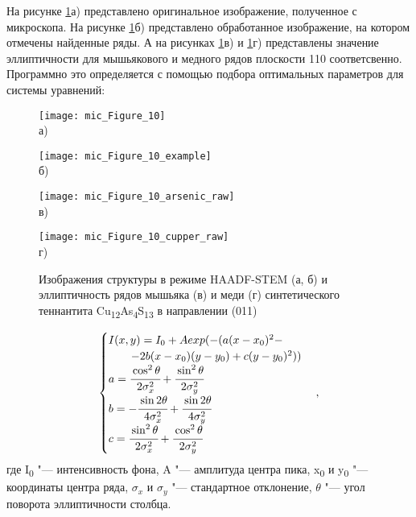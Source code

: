На рисунке \ref{img:mic1}а) представлено оригинальное изображение, полученное с микроскопа. На рисунке \ref{img:mic1}б) представлено обработанное изображение, на котором отмечены найденные ряды. А на рисунках \ref{img:mic1}в) и \ref{img:mic1}г) представлены значение эллиптичности для  мышьякового и медного рядов плоскости 110 соответсвенно.
Программно это определяется с помощью подбора оптимальных параметров для системы уравнений:
\begin{figure}[p!]
  \begin{minipage}[ht]{0.5\linewidth}\centering
    \texttt{[image: mic\_Figure\_10]} \\ а)
  \end{minipage}
  \hfill
  \begin{minipage}[ht]{0.5\linewidth}\centering
    \texttt{[image: mic\_Figure\_10\_example]} \\ б)
  \end{minipage}
\vfill
  \begin{minipage}[ht]{0.5\linewidth}\centering
    \texttt{[image: mic\_Figure\_10\_arsenic\_raw]} \\ в)
  \end{minipage}
  \hfill
  \begin{minipage}[ht]{0.5\linewidth}\centering
    \texttt{[image: mic\_Figure\_10\_cupper\_raw]} \\ г)
  \end{minipage}

      \caption[Изображения структуры в режиме HAADF-STEM (а, б) и эллиптичность рядов мышьяка (в) и меди (г) синтетического теннантита Cu\textsubscript{12}As\textsubscript{4}S\textsubscript{13} в направлении (011)]{Изображения структуры в режиме HAADF-STEM (а, б) и эллиптичность рядов мышьяка (в) и меди (г) синтетического теннантита Cu\textsubscript{12}As\textsubscript{4}S\textsubscript{13} в направлении (011)}
    \label{img:mic1}
\end{figure}

\begin{equation}
  \label{eq:equation_mic}
	\begin{cases}
	I(x,y) = I_0+Aexp(-(a(x-x_0)^2-\\
	\qquad-2b(x-x_0)(y-y_0)+c(y-y_0)^2)) \\
	a=\cfrac{\cos^2\theta}{2\sigma^2_x}+\cfrac{\sin^2\theta}{2\sigma^2_y} \\
	b= - \cfrac{\sin2\theta}{4\sigma^2_x}+\cfrac{\sin2\theta}{4\sigma^2_y}\\
	c= \cfrac{\sin^2\theta}{2\sigma^2_x}+\cfrac{\cos^2\theta}{2\sigma^2_y} \\
	\end{cases},
\end{equation}
где I\textsubscript{0} "--- интенсивность фона, A "--- амплитуда центра пика, x\textsubscript{0} и y\textsubscript{0} "--- координаты центра ряда, $\sigma_x$ и $\sigma_y$ "--- стандартное отклонение, $\theta$ "--- угол поворота эллиптичности столбца.

